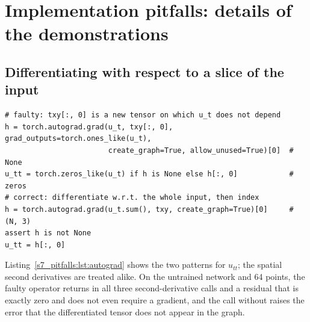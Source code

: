 \section{Implementation pitfalls: details of the demonstrations}\label{S6:sec}

\subsection{Differentiating with respect to a slice of the input}

\begin{lstlisting}[float=tp,captionpos=b,label={s7_pitfalls:lst:autograd},caption={The second time derivative computed with respect to a slice of the input (faulty) and with respect to the whole input (correct). The comments at the right give what the faulty lines return. Both patterns are executed by \texttt{code/s7\_pitfalls.py}.}]
# faulty: txy[:, 0] is a new tensor on which u_t does not depend
h = torch.autograd.grad(u_t, txy[:, 0], grad_outputs=torch.ones_like(u_t),
                        create_graph=True, allow_unused=True)[0]  # None
u_tt = torch.zeros_like(u_t) if h is None else h[:, 0]            # zeros
# correct: differentiate w.r.t. the whole input, then index
h = torch.autograd.grad(u_t.sum(), txy, create_graph=True)[0]     # (N, 3)
assert h is not None
u_tt = h[:, 0]
\end{lstlisting}

Listing~\ref{s7_pitfalls:lst:autograd} shows the two patterns for $u_{tt}$; the spatial second
derivatives are treated alike. On the untrained network and 64 points, the faulty operator returns
 in all three second-derivative calls and a residual that is exactly zero and does not
even require a gradient, and the call without  raises the error that the
differentiated tensor does not appear in the graph.

